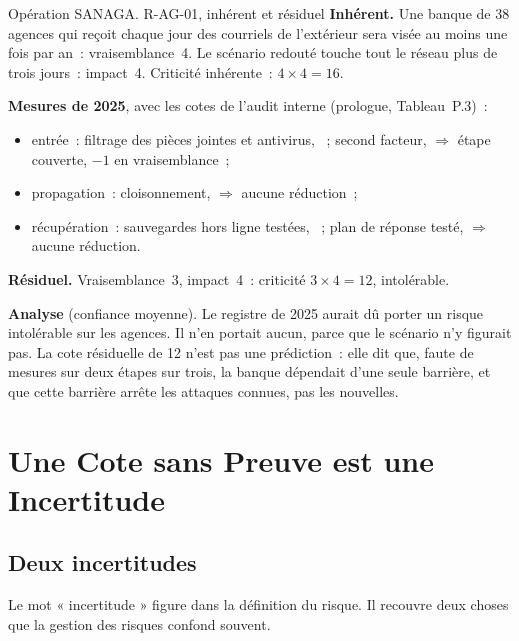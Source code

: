\begin{boxscenario}{Opération SANAGA. R-AG-01, inhérent et résiduel}
\textbf{Inhérent.} Une banque de 38 agences qui reçoit chaque jour des
courriels de l'extérieur sera visée au moins une fois par an~:
vraisemblance~4. Le scénario redouté touche tout le réseau plus de trois
jours~: impact~4. Criticité inhérente~: $4 \times 4 = 16$.

\medskip
\textbf{Mesures de 2025}, avec les cotes de l'audit interne (prologue,
Tableau~P.3)~:
\begin{itemize}
    \item entrée~: filtrage des pièces jointes et antivirus, \OUI{}~; second
          facteur, \NON{} $\Rightarrow$ étape couverte, $-1$ en
          vraisemblance~;
    \item propagation~: cloisonnement, \NON{} $\Rightarrow$ aucune
          réduction~;
    \item récupération~: sauvegardes hors ligne testées, \NON{}~; plan de
          réponse testé, \NON{} $\Rightarrow$ aucune réduction.
\end{itemize}

\textbf{Résiduel.} Vraisemblance~3, impact~4~: criticité $3 \times 4 = 12$,
intolérable.

\medskip
\textbf{Analyse} (confiance moyenne). Le registre de 2025 aurait dû porter
un risque intolérable sur les agences. Il n'en portait aucun, parce que le
scénario n'y figurait pas. La cote résiduelle de 12 n'est pas une
prédiction~: elle dit que, faute de mesures sur deux étapes sur trois, la
banque dépendait d'une seule barrière, et que cette barrière arrête les
attaques connues, pas les nouvelles.
\end{boxscenario}

\section{Une Cote sans Preuve est une Incertitude}
\label{sec:c02-incertitude}

\subsection{Deux incertitudes}

Le mot « incertitude » figure dans la définition du risque. Il recouvre
deux choses que la gestion des risques confond souvent.

